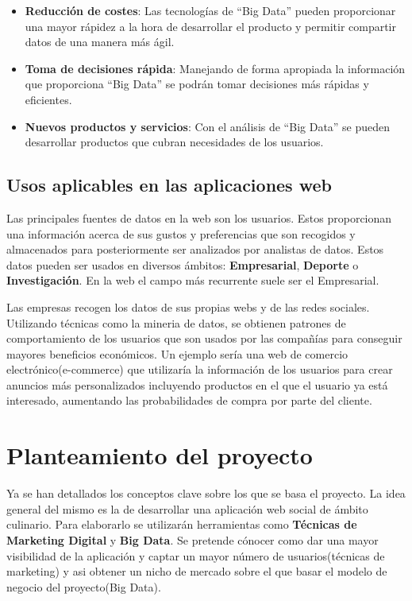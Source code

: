 \begin{itemize}
  \item \textbf{Reducción de costes}: Las tecnologías de ``Big Data'' pueden proporcionar una mayor rápidez a la hora de desarrollar el producto y permitir compartir datos de una manera más ágil.
  
  \item \textbf{Toma de decisiones rápida}: Manejando de forma apropiada la información que proporciona ``Big Data'' se podrán tomar 
  decisiones más rápidas y eficientes.
  
  \item \textbf{Nuevos productos y servicios}: Con el análisis de ``Big Data'' se pueden desarrollar productos que cubran necesidades de los usuarios.
  
\end{itemize}

\subsection{Usos aplicables en las aplicaciones web}

Las principales fuentes de datos en la web son los usuarios. Estos proporcionan una información acerca de sus gustos y preferencias que son recogidos y almacenados para posteriormente ser analizados por analistas de datos. Estos datos pueden ser usados en diversos ámbitos: \textbf{Empresarial}, \textbf{Deporte} o \textbf{Investigación}. En la web el campo más recurrente suele ser el Empresarial.

\vspace{5 mm}

Las empresas recogen los datos de sus propias webs y de las redes sociales. Utilizando técnicas como la mineria de datos, se obtienen patrones de comportamiento de los usuarios que son usados por las compañías para conseguir mayores beneficios económicos. Un ejemplo sería una web de comercio electrónico(e-commerce) que utilizaría la información de los usuarios para crear anuncios más personalizados incluyendo productos en el que el usuario ya está interesado, aumentando las probabilidades de compra por parte del cliente.


\section{Planteamiento del proyecto}

Ya se han detallados los conceptos clave sobre los que se basa el proyecto. La idea general del mismo es la de desarrollar una aplicación web social de ámbito culinario. Para elaborarlo se utilizarán herramientas como \textbf{Técnicas de Marketing Digital} y \textbf{Big Data}. Se pretende cónocer como dar una mayor visibilidad de la aplicación y captar un mayor número de usuarios(técnicas de marketing) y asi obtener un nicho de mercado sobre el que basar el modelo de negocio del proyecto(Big Data).

